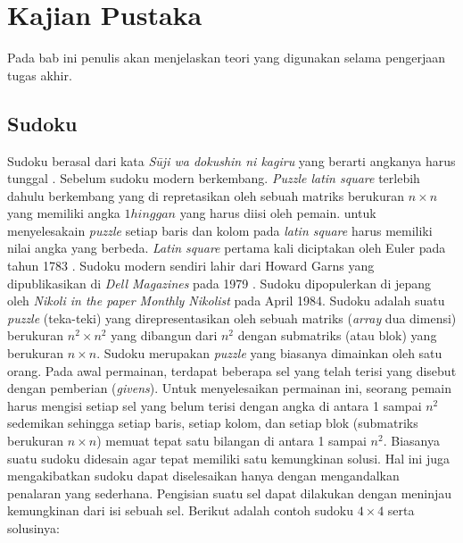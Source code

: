 \chapter{Kajian Pustaka}

Pada bab ini penulis akan menjelaskan teori yang digunakan selama pengerjaan tugas akhir.

\section{Sudoku}

Sudoku berasal dari kata \textit{Sūji wa dokushin ni kagiru} yang berarti angkanya harus tunggal \cite{SATPy3}. Sebelum sudoku modern berkembang. \textit{Puzzle latin square} terlebih dahulu berkembang yang di repretasikan oleh sebuah matriks berukuran ${n \times n}$ yang memiliki angka ${1 hingga n}$ yang harus diisi oleh pemain. untuk menyelesakain \textit{puzzle }setiap baris dan kolom pada \textit{latin square} harus memiliki nilai angka yang berbeda. \textit{Latin square} pertama kali diciptakan oleh Euler pada tahun 1783 \cite{Unk1}. Sudoku modern sendiri lahir dari  Howard Garns yang dipublikasikan di \textit{Dell Magazines} pada 1979 \cite{SATPy5}. Sudoku dipopulerkan di jepang oleh \textit{Nikoli in the paper Monthly Nikolist} pada April 1984. Sudoku adalah suatu \textit{puzzle} (teka-teki) yang direpresentasikan oleh sebuah matriks (\textit{array}
dua dimensi) berukuran ${n^2 \times n^2}$  yang dibangun dari ${n^2}$ dengan submatriks (atau blok)
yang berukuran ${n \times n}$. Sudoku merupakan \textit{puzzle}
yang biasanya dimainkan oleh satu orang.  Pada
awal permainan, terdapat beberapa sel yang telah terisi yang disebut dengan pemberian
(\textit{givens}). Untuk menyelesaikan permainan ini, seorang pemain harus mengisi setiap sel yang
belum terisi dengan angka di antara 1 sampai
$n^2$ sedemikan sehingga setiap baris, setiap kolom,
dan setiap blok (submatriks berukuran $n \times n$) memuat tepat satu bilangan di antara 1 sampai $n^2$. Biasanya suatu sudoku didesain agar tepat memiliki satu kemungkinan solusi. Hal
ini juga mengakibatkan sudoku dapat diselesaikan hanya dengan mengandalkan penalaran
yang sederhana. Pengisian suatu sel dapat dilakukan dengan meninjau kemungkinan dari
isi sebuah sel. Berikut adalah contoh sudoku $4 \times 4$ serta solusinya:

